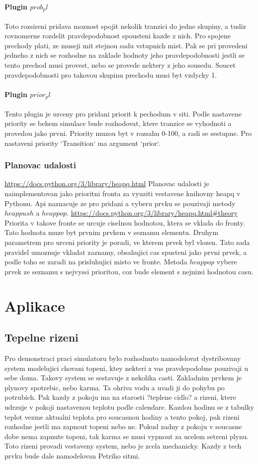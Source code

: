 \subsubsection{Plugin $prob_pl$}
Toto rozsireni pridava moznost spojit nekolik tranzici do jedne skupiny, a tudiz rovnomerne rozdelit pravdepodobnost spousteni kazde z nich. Pro spojene prechody plati, ze museji mit stejnou sadu vstupnich mist. Pak se pri provedeni jedneho z nich se rozhodne na zaklade hodnoty jeho pravdepodobnosti jestli se tento prechod musi provest, nebo se provede nektery z jeho sousedu. Soucet pravdepodobnosti pro takovou skupinu prechodu musi byt vzdycky 1.

\subsubsection{Plugin $prior_pl$}
Tento plugin je urceny pro pridani priorit k pechodum v siti. Podle nastavene priority se behem simulace bude rozhodovat, ktere tranzice se vyhodnoti a provedou jako prvni. Priority muzou byt v rozsahu 0-100, a radi se sestupne. Pro nastaveni priority `Transition` ma argument `prior`.

\subsection{Planovac udalosti}
\url{https://docs.python.org/3/library/heapq.html}
Planovac udalosti je naimplementovan jako prioritni fronta za vyuziti vestavene knihovny heapq v Pythonu. Api naznacuje ze pro pridani a vyberu prvku se pouzivaji metody $heappush$ a $heappop$. \url{https://docs.python.org/3/library/heapq.html#theory} Priorita v takove fronte se urcuje ciselnou hodnotou, ktera se vklada do fronty. Tato hodnota muze byt prvnim prvkem v seznamu elementu. Druhym parametrem pro urceni priority je poradi, ve kterem prvek byl vlozen. Tato sada pravidel umoznuje vkladat zaznamy, obsahujici cas spusteni jako prvni prvek, a podle toho se zaradi na prisluhujici misto ve fronte. Metoda $heappop$ vybere prvek ze seznamu s nejvyssi prioritou, coz bude element s nejnizsi hodnotou casu.
\chapter{Aplikace}
\section{Tepelne rizeni}
Pro demonstraci praci simulatoru bylo rozhodnuto namodelovat dystribovany system modelujici chovani topeni, ktey nekteri z vas pravdepodobne pouzivaji u sebe doma. Takovy system se sestavuje z nekolika casti. Zakladnim prvkem je plynovy spotrebic, nebo karma. Ta ohriva vodu a uvadi ji do pohybu po potrubich. Pak kazdy z pokoju ma na starosti ?teplene cidlo? a rizeni, ktere udrzuje v pokoji nastavenou teplotu podle calendare. Kazdou hodinu se z tabulky teplot vezme aktualni teplota pro soucasnou hodiny a tento pokoj, pak rizeni rozhodne jestli ma zapnout topeni nebo ne. Pokud zadny z pokoju v soucasne dobe nema zapnute topeni, tak karma se musi vypnout za ucelem setreni plynu. Toto rizeni provadi vestaveny system, nebo je zcela mechanicky. Kazdy z tech prvku bude dale namodelovan Petriho sitmi.

